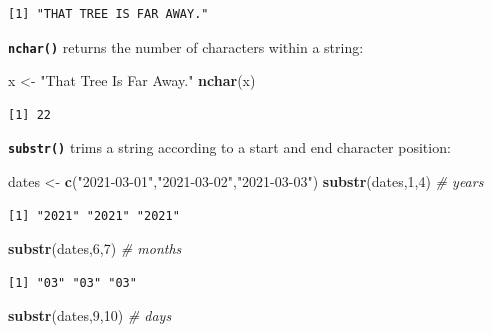 \documentclass[
]{book}
\newenvironment{Shaded}{\begin{snugshade}}{\end{snugshade}}
\newcommand{\CommentTok}[1]{\textcolor[rgb]{0.56,0.35,0.01}{\textit{#1}}}
\newcommand{\DecValTok}[1]{\textcolor[rgb]{0.00,0.00,0.81}{#1}}
\newcommand{\KeywordTok}[1]{\textcolor[rgb]{0.13,0.29,0.53}{\textbf{#1}}}
\newcommand{\NormalTok}[1]{#1}
\newcommand{\StringTok}[1]{\textcolor[rgb]{0.31,0.60,0.02}{#1}}
\begin{document}
\begin{verbatim}
[1] "THAT TREE IS FAR AWAY."
\end{verbatim}

\textbf{\texttt{nchar()}} returns the number of characters within a string:

\begin{Shaded}
\begin{Highlighting}[]
\NormalTok{x <-}\StringTok{ "That Tree Is Far Away."}
\KeywordTok{nchar}\NormalTok{(x)}
\end{Highlighting}
\end{Shaded}

\begin{verbatim}
[1] 22
\end{verbatim}

\textbf{\texttt{substr()}} trims a string according to a start and end character position:

\begin{Shaded}
\begin{Highlighting}[]
\NormalTok{dates <-}\StringTok{ }\KeywordTok{c}\NormalTok{(}\StringTok{"2021-03-01"}\NormalTok{,}\StringTok{"2021-03-02"}\NormalTok{,}\StringTok{"2021-03-03"}\NormalTok{)}
\KeywordTok{substr}\NormalTok{(dates,}\DecValTok{1}\NormalTok{,}\DecValTok{4}\NormalTok{) }\CommentTok{# years}
\end{Highlighting}
\end{Shaded}

\begin{verbatim}
[1] "2021" "2021" "2021"
\end{verbatim}

\begin{Shaded}
\begin{Highlighting}[]
\KeywordTok{substr}\NormalTok{(dates,}\DecValTok{6}\NormalTok{,}\DecValTok{7}\NormalTok{) }\CommentTok{# months}
\end{Highlighting}
\end{Shaded}

\begin{verbatim}
[1] "03" "03" "03"
\end{verbatim}

\begin{Shaded}
\begin{Highlighting}[]
\KeywordTok{substr}\NormalTok{(dates,}\DecValTok{9}\NormalTok{,}\DecValTok{10}\NormalTok{) }\CommentTok{# days}
\end{Highlighting}
\end{Shaded}
\end{document}
